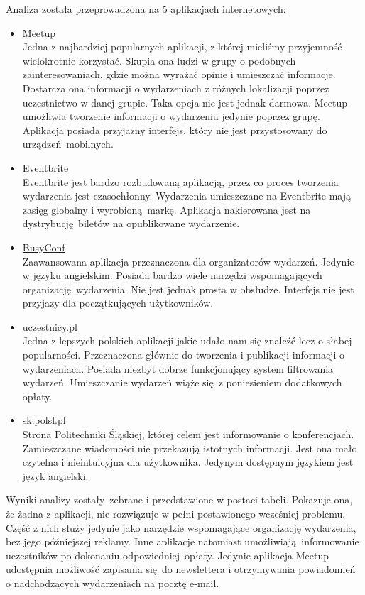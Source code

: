 Analiza została przeprowadzona na 5 aplikacjach internetowych:
\begin{itemize}
  \item \href{http://www.meetup.com/}{Meetup} \\
  Jedna z najbardziej popularnych aplikacji, z której mieliśmy przyjemność wielokrotnie korzystać. Skupia ona ludzi w grupy o podobnych zainteresowaniach, gdzie można wyrażać opinie i umieszczać informacje. Dostarcza ona informacji o wydarzeniach z różnych lokalizacji poprzez uczestnictwo w danej grupie. Taka opcja nie jest jednak darmowa. Meetup umożliwia tworzenie informacji o wydarzeniu jedynie poprzez grupę. Aplikacja posiada przyjazny interfejs, który nie jest przystosowany do urządzeń mobilnych.
  \item \href{https://www.eventbrite.com/}{Eventbrite} \\
  Eventbrite jest bardzo rozbudowaną aplikacją, przez co proces tworzenia wydarzenia jest czasochłonny. Wydarzenia umieszczane na Eventbrite mają zasięg globalny i wyrobioną markę. Aplikacja nakierowana jest na dystrybucję biletów na opublikowane wydarzenie.
  \item \href{http://busyconf.com/}{BusyConf} \\
  Zaawansowana aplikacja przeznaczona dla organizatorów wydarzeń. Jedynie w języku angielskim. Posiada bardzo wiele narzędzi wspomagających organizację wydarzenia. Nie jest jednak prosta w obsłudze. Interfejs nie jest przyjazy dla początkujących użytkowników.
  \item \href{http://www.uczestnicy.pl/}{uczestnicy.pl} \\
  Jedna z lepszych polskich aplikacji jakie udało nam się znaleźć lecz o słabej popularności. Przeznaczona głównie do tworzenia i publikacji informacji o wydarzeniach. Posiada niezbyt dobrze funkcjonujący system filtrowania wydarzeń. Umieszczanie wydarzeń wiąże się z poniesieniem dodatkowych opłaty.
  \item \href{http://sk.polsl.pl/}{sk.polsl.pl} \\
  Strona Politechniki Śląskiej, której celem jest informowanie o konferencjach. Zamieszczane wiadomości nie przekazują istotnych informacji. Jest ona mało czytelna i nieintuicyjna dla użytkownika. Jedynym dostępnym językiem jest język angielski.
\end{itemize}


Wyniki analizy zostały zebrane i przedstawione w postaci tabeli. Pokazuje ona, że żadna z aplikacji, nie rozwiązuje w pełni postawionego wcześniej problemu. Część z nich służy jedynie jako narzędzie wspomagające organizację wydarzenia, bez jego późniejszej reklamy. Inne aplikacje natomiast umożliwiają informowanie uczestników po dokonaniu odpowiedniej opłaty. Jedynie aplikacja Meetup udostępnia możliwość zapisania się do newslettera i otrzymywania powiadomień o nadchodzących wydarzeniach na pocztę e-mail.


